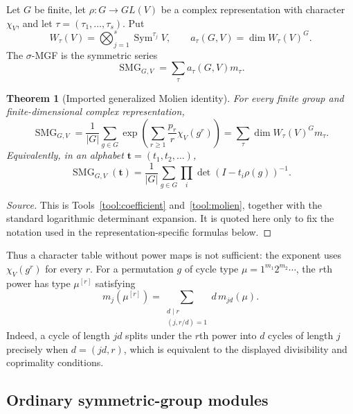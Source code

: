 \documentclass[10pt]{article}
\newcommand{\Sym}{\operatorname{Sym}}
\newcommand{\SMG}{\operatorname{SMG}}
\newcommand{\MGF}{\SMG}
\newtheorem{theorem}{Theorem}
\begin{document}
Let $G$ be finite, let $\rho:G\to GL(V)$ be a complex representation with
character $\chi_V$, and let $\tau=(\tau_1,\ldots,\tau_s)$.  Put
\[
 W_\tau(V)=\bigotimes_{j=1}^s\Sym^{\tau_j}V,
 \qquad
 a_\tau(G,V)=\dim W_\tau(V)^G.
\]
The $\sigma$-MGF is the symmetric series
\[
 \MGF_{G,V}=\sum_\tau a_\tau(G,V)m_\tau.
\]

\begin{theorem}[Imported generalized Molien identity]\label{nd:symmetric_spin_lie_tree:thm:molien}
For every finite group and finite-dimensional complex representation,
\begin{equation}\label{nd:symmetric_spin_lie_tree:eq:molien}
 \boxed{
 \MGF_{G,V}
 =\frac1{|G|}\sum_{g\in G}
 \exp\!\left(\sum_{r\ge1}\frac{p_r}{r}\chi_V(g^r)\right)
 =\sum_\tau\dim W_\tau(V)^Gm_\tau.}
\end{equation}
Equivalently, in an alphabet $\mathbf t=(t_1,t_2,\ldots)$,
\begin{equation}\label{nd:symmetric_spin_lie_tree:eq:det-molien}
 \MGF_{G,V}(\mathbf t)
 =\frac1{|G|}\sum_{g\in G}\prod_i
 \det(I-t_i\rho(g))^{-1}.
\end{equation}
\end{theorem}

\begin{proof}[Source]
This is Tools~\ref{tool:coefficient} and~\ref{tool:molien}, together with the
standard logarithmic determinant expansion. It is quoted here only to fix the
notation used in the representation-specific formulas below.
\end{proof}

Thus a character table without power maps is not sufficient: the exponent
uses $\chi_V(g^r)$ for every $r$.  For a permutation $g$ of cycle type
$\mu=1^{m_1}2^{m_2}\cdots$, the $r$th power has type $\mu^{[r]}$ satisfying
\begin{equation}\label{nd:symmetric_spin_lie_tree:eq:power-map}
 \boxed{m_j(\mu^{[r]})=
 \sum_{\substack{d\mid r\\(j,r/d)=1}}d\,m_{jd}(\mu).}
\end{equation}
Indeed, a cycle of length $jd$ splits under the $r$th power into $d$ cycles
of length $j$ precisely when $d=(jd,r)$, which is equivalent to the displayed
divisibility and coprimality conditions.

\subsection{Ordinary symmetric-group modules}
\end{document}
